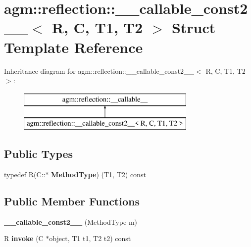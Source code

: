 \hypertarget{structagm_1_1reflection_1_1____callable__const2____}{}\section{agm\+:\+:reflection\+:\+:\+\_\+\+\_\+callable\+\_\+const2\+\_\+\+\_\+$<$ R, C, T1, T2 $>$ Struct Template Reference}
\label{structagm_1_1reflection_1_1____callable__const2____}
Inheritance diagram for agm\+:\+:reflection\+:\+:\+\_\+\+\_\+callable\+\_\+const2\+\_\+\+\_\+$<$ R, C, T1, T2 $>$\+:\begin{figure}[H]
\begin{center}
\leavevmode
\includegraphics[height=2.000000cm]{structagm_1_1reflection_1_1____callable__const2____}
\end{center}
\end{figure}
\subsection*{Public Types}
\begin{DoxyCompactItemize}
\item 
typedef R(C\+::$\ast$ {\bfseries Method\+Type}) (T1, T2) const \hypertarget{structagm_1_1reflection_1_1____callable__const2_____ab9845e666cc46557fc8395f88395822a}{}\label{structagm_1_1reflection_1_1____callable__const2_____ab9845e666cc46557fc8395f88395822a}

\end{DoxyCompactItemize}
\subsection*{Public Member Functions}
\begin{DoxyCompactItemize}
\item 
{\bfseries \+\_\+\+\_\+callable\+\_\+const2\+\_\+\+\_\+} (Method\+Type m)\hypertarget{structagm_1_1reflection_1_1____callable__const2_____aa55ffc7fd4175efc3c4687211d319318}{}\label{structagm_1_1reflection_1_1____callable__const2_____aa55ffc7fd4175efc3c4687211d319318}

\item 
R {\bfseries invoke} (C $\ast$object, T1 t1, T2 t2) const \hypertarget{structagm_1_1reflection_1_1____callable__const2_____a18a0404439849a7abb5839f25917842c}{}\label{structagm_1_1reflection_1_1____callable__const2_____a18a0404439849a7abb5839f25917842c}

\end{DoxyCompactItemize}
